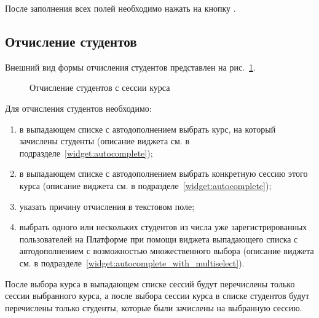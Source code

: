 После заполнения всех полей необходимо нажать на кнопку .

\subsection{Отчисление студентов}
Внешний вид формы отчисления студентов представлен на рис.~\ref{img:student:unenroll}. 

\begin{figure}[H]
	\caption{Отчисление студентов с сессии курса}
	\label{img:student:unenroll}
\end{figure}


Для отчисления студентов необходимо:
\begin{enumerate}
	\item в выпадающем списке с автодополнением выбрать курс, на который зачислены студенты 
	(описание виджета см. в подразделе~\ref{widget:autocomplete});
	\item в выпадающем списке с автодополнением выбрать конкретную сессию этого курса 
	(описание виджета см. в подразделе~\ref{widget:autocomplete});
	\item указать причину отчисления в текстовом поле; 
	\item выбрать одного или нескольких студентов из числа уже зарегистрированных пользователей на Платформе при помощи 
	виджета выпадающего списка с автодополнением с возможностью множественного выбора 
	(описание виджета см. в подразделе~\ref{widget:autocomplete_with_multiselect}). 
\end{enumerate}

После выбора курса в выпадающем списке сессий будут перечислены только сессии выбранного курса, 
а после выбора сессии курса в списке студентов будут перечислены только студенты, 
которые были зачислены на выбранную сессию.


